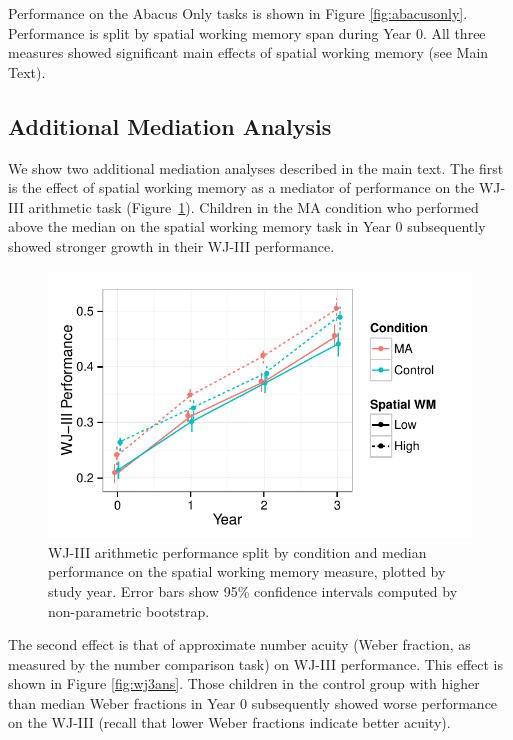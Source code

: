 \documentclass[11pt]{article}
\begin{document}
Performance on the Abacus Only tasks is shown in Figure \ref{fig:abacusonly}. Performance is split by spatial working memory span during Year 0. All three measures showed significant main effects of spatial working memory (see Main Text).

\subsection{Additional Mediation Analysis}

We show two additional mediation analyses described in the main text. The first is the effect of spatial working memory as a mediator of performance on the WJ-III arithmetic task (Figure~\ref{fig:wj3swm}). Children in the MA condition who performed above the median on the spatial working memory task in Year 0 subsequently showed stronger growth in their WJ-III performance. 


\begin{figure}[H]
\begin{center}
\includegraphics[width=4.5in]{figures/wj_by_swm.pdf}
\end{center}
\caption{WJ-III arithmetic performance split by condition and median performance on the spatial working memory measure, plotted by study year. Error bars show 95\% confidence intervals computed by non-parametric bootstrap.}
\label{fig:wj3swm}
\end{figure}

The second effect is that of approximate number acuity (Weber fraction, as measured by the number comparison task) on WJ-III performance. This effect is shown in Figure \ref{fig:wj3ans}. Those children in the control group with higher than median Weber fractions in Year 0 subsequently showed worse performance on the WJ-III (recall that lower Weber fractions indicate better acuity). 
\end{document}
